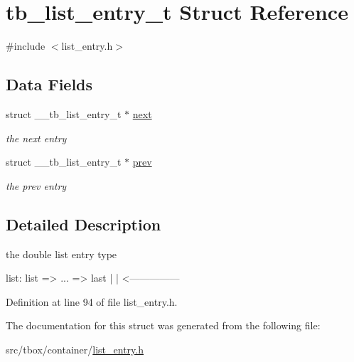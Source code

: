 \hypertarget{structtb__list__entry__t}{\section{tb\-\_\-list\-\_\-entry\-\_\-t Struct Reference}
\label{structtb__list__entry__t}
}


{\ttfamily \#include $<$list\-\_\-entry.\-h$>$}

\subsection*{Data Fields}
\begin{DoxyCompactItemize}
\item 
\hypertarget{structtb__list__entry__t_a86c3bdd1586e5efa3dd46325f7937708}{struct \-\_\-\-\_\-tb\-\_\-list\-\_\-entry\-\_\-t $\ast$ \hyperlink{structtb__list__entry__t_a86c3bdd1586e5efa3dd46325f7937708}{next}}\label{structtb__list__entry__t_a86c3bdd1586e5efa3dd46325f7937708}

\begin{DoxyCompactList}\small\item\em the next entry \end{DoxyCompactList}\item 
\hypertarget{structtb__list__entry__t_aa176c92c5d2fc56e7518294472e5a4b4}{struct \-\_\-\-\_\-tb\-\_\-list\-\_\-entry\-\_\-t $\ast$ \hyperlink{structtb__list__entry__t_aa176c92c5d2fc56e7518294472e5a4b4}{prev}}\label{structtb__list__entry__t_aa176c92c5d2fc56e7518294472e5a4b4}

\begin{DoxyCompactList}\small\item\em the prev entry \end{DoxyCompactList}\end{DoxyCompactItemize}


\subsection{Detailed Description}
the double list entry type


\begin{DoxyPre}
list: list => ... => last
       |               |
       <---------------\end{DoxyPre}



\begin{DoxyPre}\end{DoxyPre}
 

Definition at line 94 of file list\-\_\-entry.\-h.



The documentation for this struct was generated from the following file\-:\begin{DoxyCompactItemize}
\item 
src/tbox/container/\hyperlink{list__entry_8h}{list\-\_\-entry.\-h}\end{DoxyCompactItemize}

